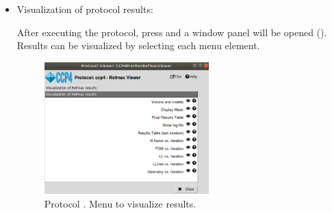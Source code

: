 \begin{itemize}
  \item Visualization of protocol results:
  
  After executing the protocol, press  and a window panel will be opened (). Results can be visualized by selecting each menu element. 
  
  \begin{figure}[H]
     \centering 
     \captionsetup{width=.7\linewidth} 
     \includegraphics[width=0.60\textwidth]{Images_appendix/Fig127.pdf}
     \caption{Protocol . Menu to visualize  results.}
     \label{fig:app_protocol_refmac_2}
    \end{figure}
    

\end{itemize}
